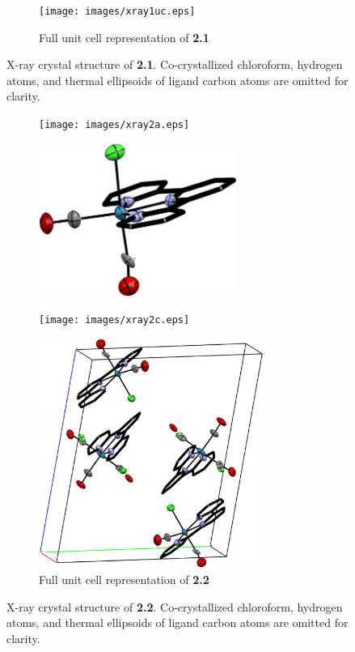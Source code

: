 \begin{figure}[!ht]
\begin{subfigure}[b]{0.49\textwidth}
 \end{subfigure}
 \begin{subfigure}[b]{\textwidth}
  \centering
  \texttt{[image: images/xray1uc.eps]}
  \caption{Full unit cell representation of \textbf{2.1}}
 \end{subfigure}
\caption[X-ray crystal structure of \textbf{2.1}]{X-ray crystal structure of \textbf{2.1}. Co-crystallized chloroform, hydrogen atoms, and thermal ellipsoids of ligand carbon atoms are omitted for clarity.}
\label{fig.xray21}
\end{figure}

\begin{figure}[!ht]
 \centering
 \begin{subfigure}[b]{0.49\textwidth}
  \texttt{[image: images/xray2a.eps]}
 \end{subfigure}
 \begin{subfigure}[b]{0.49\textwidth}
  \includegraphics[clip=true, width=\textwidth, height=50mm, keepaspectratio]{images/xray2b.eps}
 \end{subfigure}
 \begin{subfigure}[b]{0.49\textwidth}
  \texttt{[image: images/xray2c.eps]}
 \end{subfigure}
 \begin{subfigure}[b]{\textwidth}
  \centering
  \includegraphics[clip=true, width=\textwidth, height=75mm, keepaspectratio]{images/xray2uc.eps}
  \caption{Full unit cell representation of \textbf{2.2}}
 \end{subfigure}
\caption[X-ray crystal structure of \textbf{2.2}]{X-ray crystal structure of \textbf{2.2}. Co-crystallized chloroform, hydrogen atoms, and thermal ellipsoids of ligand carbon atoms are omitted for clarity.}
\label{fig.xray22}
\end{figure}

